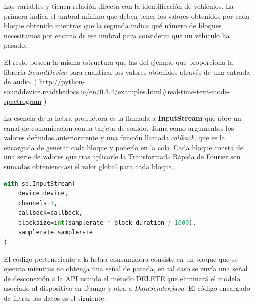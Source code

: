 Las variables  y  tienen relación directa con la identificación de vehículos. La primera indica el umbral mínimo que deben tener los valores obtenidos por cada bloque obtenido mientras que la segunda indica qué número de bloques necesitamos por encima de ese umbral para considerar que un vehículo ha pasado.

El resto poseen la misma estructura que las del ejemplo que proporciona la librería \textit{SoundDevice} para cuantizar los valores obtenidos através de una entrada de audio. ( \url{http://python-sounddevice.readthedocs.io/en/0.3.4/examples.html#real-time-text-mode-spectrogram} )


\bigskip

La esencia de la hebra productora es la llamada a \textbf{InputStream} que abre un canal de comunicación con la tarjeta de sonido. Toma como argumentos los valores definidos anteriormente y una función llamada \textit{callback}, que es la encargada de generar cada bloque y ponerlo en la cola. Cada bloque consta de una serie de valores que tras aplicarle la Transformada Rápida de Fourier son sumados obtenieno así el valor global para cada bloque.

\begin{lstlisting}[language=python,caption={Hebra productora},label={lst:pi1}]
with sd.InputStream(
	device=device,
	channels=1,
	callback=callback,
	blocksize=int(samplerate * block_duration / 1000),
	samplerate=samplerate
)
\end{lstlisting}

\bigskip

El código perteneciente a la hebra consumidora consiste en un bloque que se ejecuta mientras no obtenga una señal de parada, en tal caso se envía una señal de desconexión a la API usando el método DELETE que eliminará el modelo asociado al dispositivo en Django y otra a \textit{DataSender.java}. El código encargado de filtrar los datos es el siguiente:

